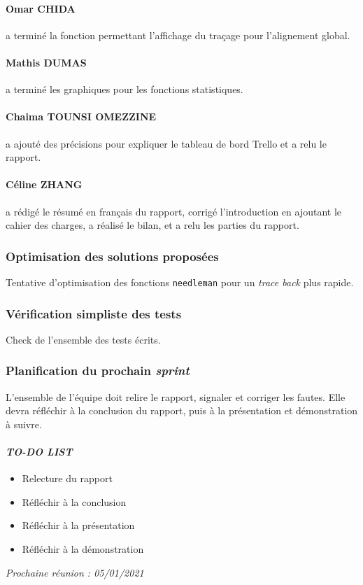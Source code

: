 \paragraph*{Omar CHIDA} a terminé la fonction permettant l'affichage du traçage pour l'alignement global.

\paragraph*{Mathis DUMAS} a terminé les graphiques pour les fonctions statistiques.

\paragraph*{Chaima TOUNSI OMEZZINE} a ajouté des précisions pour expliquer le tableau de bord Trello et a relu le rapport.

\paragraph*{Céline ZHANG} a rédigé le résumé en français du rapport, corrigé l'introduction en ajoutant le cahier des charges, a réalisé le bilan, et a relu les parties du rapport.


\subsubsection*{Optimisation des solutions proposées}
Tentative d'optimisation des fonctions \texttt{needleman} pour un \textsl{trace back} plus rapide.

\subsubsection*{Vérification simpliste des tests}
Check de l'ensemble des tests écrits.

\subsubsection*{Planification du prochain \textsl{sprint}}
L'ensemble de l'équipe doit relire le rapport, signaler et corriger les fautes. Elle devra réfléchir à la conclusion du rapport, puis à la présentation et démonstration à suivre.

\paragraph{\emph{TO-DO LIST}}
\begin{itemize}
    \item Relecture du rapport
    \item Réfléchir à la conclusion
    \item Réfléchir à la présentation
    \item Réfléchir à la démonstration
\end{itemize}

\emph{Prochaine réunion : 05/01/2021}\\

% 
